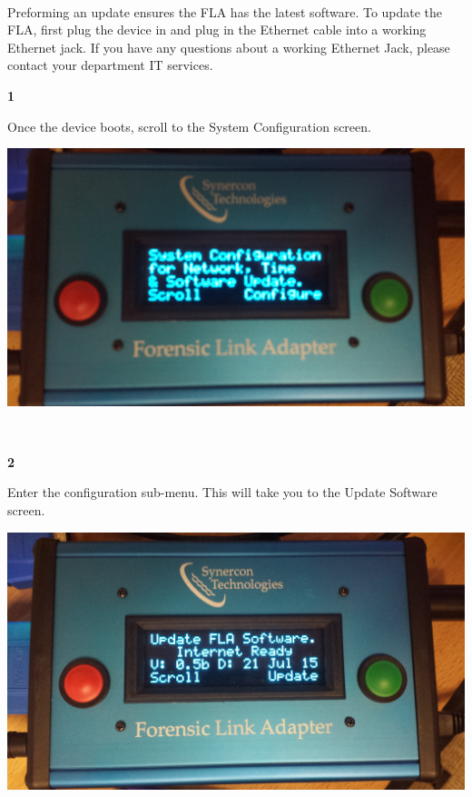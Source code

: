 \documentclass[11pt, oneside]{book}
\begin{document}
\paragraph{  }
Preforming an update ensures the FLA has the latest software. To update the FLA, first plug the device in and plug in the Ethernet cable into a working Ethernet jack. If you have any questions about a working Ethernet Jack, please contact your department IT services.
\\[\baselineskip]
\noindent\begin{minipage}{0.45\textwidth}%
\begin{center}
\textbf{1}\\[\baselineskip]
\end{center}
Once the device boots, scroll to the System Configuration screen.
\end{minipage}%
\hfill%
\begin{minipage}{0.45\textwidth}
\includegraphics[width=\linewidth]{../media/fla_screens/sys_conf}
\end{minipage}
\\[\baselineskip]
\noindent\begin{minipage}{0.45\textwidth}%
\begin{center}
\textbf{2}\\[\baselineskip]
\end{center}
Enter the configuration sub-menu. This will take you to the Update Software screen.
\end{minipage}%
\hfill%
\begin{minipage}{0.45\textwidth}
\includegraphics[width=\linewidth]{../media/fla_screens/update_ready}
\end{minipage}
\end{document}
